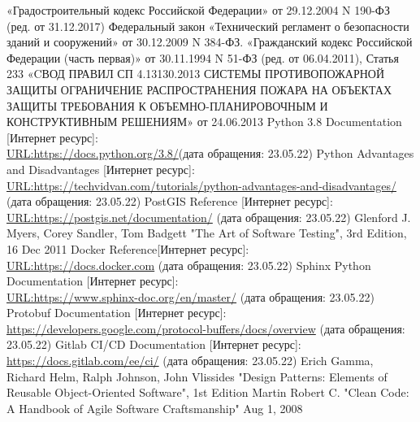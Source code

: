 
\begin{thebibliography}{8}
	«Градостроительный кодекс Российской Федерации» от 29.12.2004 N 190-ФЗ (ред. от 31.12.2017)
	Федеральный закон «Технический регламент о безопасности зданий и сооружений» от 30.12.2009 N 384-ФЗ.
	«Гражданский кодекс Российской Федерации (часть первая)» от 30.11.1994 N 51-ФЗ (ред. от 06.04.2011), Статья 233
	«CВОД ПРАВИЛ СП 4.13130.2013
	СИСТЕМЫ ПРОТИВОПОЖАРНОЙ ЗАЩИТЫ
	ОГРАНИЧЕНИЕ РАСПРОСТРАНЕНИЯ ПОЖАРА НА ОБЪЕКТАХ ЗАЩИТЫ
	ТРЕБОВАНИЯ
	К ОБЪЕМНО-ПЛАНИРОВОЧНЫМ И КОНСТРУКТИВНЫМ РЕШЕНИЯМ» от 24.06.2013
	 Python 3.8 Documentation [Интернет ресурс]:\\
	\url{URL:https://docs.python.org/3.8/}(дата обращения: 23.05.22)
	 Python Advantages and Disadvantages [Интернет ресурс]:\\
	\url{URL:https://techvidvan.com/tutorials/python-advantages-and-disadvantages/} (дата обращения: 23.05.22)
	 PostGIS Reference [Интернет ресурс]:\\
	\url{URL:https://postgis.net/documentation/} (дата обращения: 23.05.22)
	Glenford J. Myers, Corey Sandler, Tom Badgett "The Art of Software Testing", 3rd Edition, 16 Dec 2011
	 Docker Reference[Интернет ресурс]:\\
	\url{URL:https://docs.docker.com} (дата обращения: 23.05.22)
	 Sphinx Python Documentation [Интернет ресурс]:\\
	\url{URL:https://www.sphinx-doc.org/en/master/} (дата обращения: 23.05.22)
	 Protobuf Documentation [Интернет ресурс]:\\
	\url{https://developers.google.com/protocol-buffers/docs/overview} (дата обращения: 23.05.22)
	 Gitlab CI/CD Documentation [Интернет ресурс]:\\
	\url{https://docs.gitlab.com/ee/ci/} (дата обращения: 23.05.22)
	Erich Gamma, Richard Helm, Ralph Johnson, John Vlissides
	"Design Patterns: Elements of Reusable Object-Oriented Software", 1st Edition
	Martin Robert C. "Clean Code: A Handbook of Agile Software Craftsmanship" Aug 1, 2008
\end{thebibliography}
